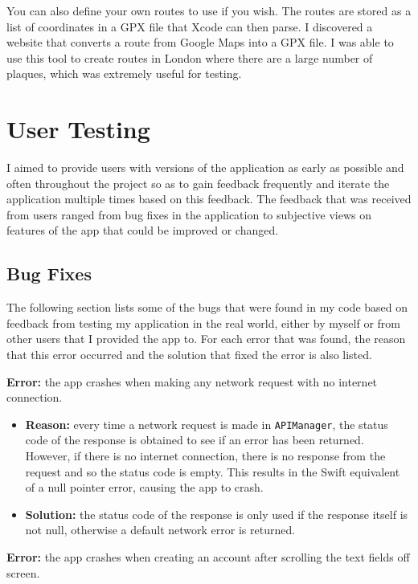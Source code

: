 You can also define your own routes to use if you wish. The routes are stored as a list of coordinates in a GPX file that Xcode can then parse. I discovered a website \cite{Sigmundarson} that converts a route from Google Maps into a GPX file. I was able to use this tool to create routes in London where there are a large number of plaques, which was extremely useful for testing.

\section{User Testing}

I aimed to provide users with versions of the application as early as possible and often throughout the project so as to gain feedback frequently and iterate the application multiple times based on this feedback. The feedback that was received from users ranged from bug fixes in the application to subjective views on features of the app that could be improved or changed.

\subsection{Bug Fixes}

The following section lists some of the bugs that were found in my code based on feedback from testing my application in the real world, either by myself or from other users that I provided the app to. For each error that was found, the reason that this error occurred and the solution that fixed the error is also listed.

\noindent \textbf{Error:} the app crashes when making any network request with no internet connection.

\begin{itemize}
  \item \textbf{Reason:} every time a network request is made in \verb|APIManager|, the status code of the response is obtained to see if an error has been returned. However, if there is no internet connection, there is no response from the request and so the status code is empty. This results in the Swift equivalent of a null pointer error, causing the app to crash.
  
  \item \textbf{Solution:} the status code of the response is only used if the response itself is not null, otherwise a default network error is returned.
\end{itemize}
  
\noindent \textbf{Error:} the app crashes when creating an account after scrolling the text fields off screen.

